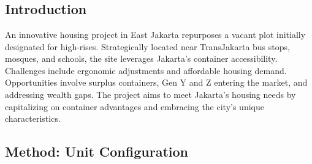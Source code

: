 \chapter*{\ChapterTitle}
\ChapterSetTocAddData{\ChapterDetailsLine}
\ChapterSetDetailsData{\ChapterDescription}{\ChapterDetailsLine}{\ChapterDetailsTabular}
\RuleAbstract
\ChapterAbstract
\vspace{\baselineskip}%
\par%
\edef\MinipageHeight{\the\dimexpr(\pagegoal-\pagetotal-\textheight-\baselineskip)\relax}
\begin{minipage}[t][\MinipageHeight][t]{\linewidth}
	\section*{
	  Introduction
	 }
	An innovative housing project in East Jakarta repurposes a vacant plot initially designated for high-rises. Strategically located near TransJakarta bus stops, mosques, and schools, the site leverages Jakarta's container accessibility. Challenges include ergonomic adjustments and affordable housing demand. Opportunities involve surplus containers, Gen Y and Z entering the market, and addressing wealth gaps. The project aims to meet Jakarta's housing needs by capitalizing on container advantages and embracing the city's unique characteristics.
	\vfill
	\section*{
	  Method: Unit Configuration
	 }
	
	\vfill
	
\end{minipage}
\columnbreak%
